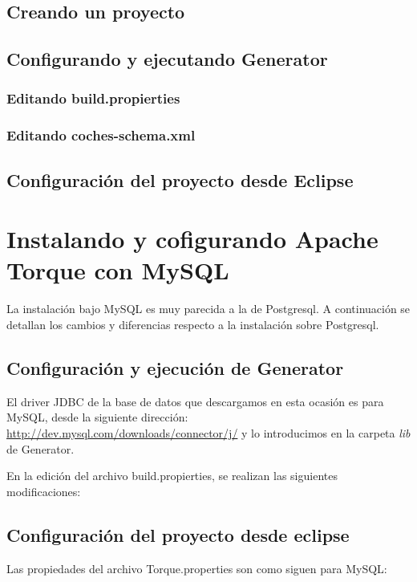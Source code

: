 \documentclass[12pt, oneside]{article}
\begin{document}
	\subsection{Creando un proyecto}
		

	\subsection{Configurando y ejecutando Generator}
		

		\subsubsection{Editando build.propierties}
			

		\subsubsection{Editando coches-schema.xml}
			

	\subsection{Configuración del proyecto desde Eclipse}
		
	
\section{Instalando y cofigurando Apache Torque con MySQL}
	
La instalación bajo MySQL es muy parecida a la de Postgresql. A continuación se detallan los cambios y diferencias respecto a la instalación sobre Postgresql.

\subsection{Configuración y ejecución de Generator}
El driver JDBC de la base de datos que descargamos en esta ocasión es para MySQL, desde la siguiente dirección: \url{http://dev.mysql.com/downloads/connector/j/} y lo introducimos en la carpeta {\em lib} de Generator.

En la edición del archivo build.propierties, se realizan las siguientes modificaciones:


\subsection{Configuración del proyecto desde eclipse}
Las propiedades del archivo Torque.properties son como siguen para MySQL:
\end{document}
